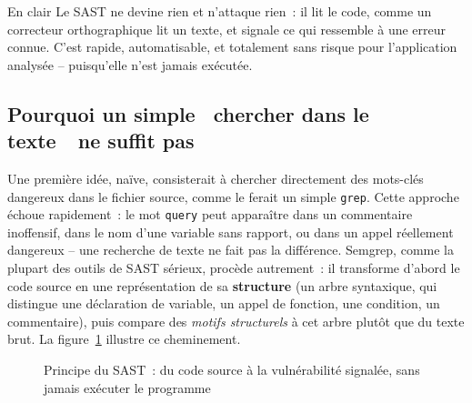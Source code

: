 \documentclass[12pt,a4paper,oneside]{report}
\begin{document}
\begin{infobox}{En clair}
Le SAST ne devine rien et n'attaque rien~: il lit le code, comme un correcteur orthographique lit un texte, et signale ce qui ressemble \`a une erreur connue. C'est rapide, automatisable, et totalement sans risque pour l'application analys\'ee -- puisqu'elle n'est jamais ex\'ecut\'ee.
\end{infobox}

\subsection{Pourquoi un simple \guillemotleft~chercher dans le texte~\guillemotright\ ne suffit pas}
Une premi\`ere id\'ee, na\"ive, consisterait \`a chercher directement des mots-cl\'es dangereux dans le fichier source, comme le ferait un simple \texttt{grep}. Cette approche \'echoue rapidement~: le mot \texttt{query} peut appara\^itre dans un commentaire inoffensif, dans le nom d'une variable sans rapport, ou dans un appel r\'eellement dangereux -- une recherche de texte ne fait pas la diff\'erence. Semgrep, comme la plupart des outils de SAST s\'erieux, proc\`ede autrement~: il transforme d'abord le code source en une repr\'esentation de sa \textbf{structure} (un arbre syntaxique, qui distingue une d\'eclaration de variable, un appel de fonction, une condition, un commentaire), puis compare des \emph{motifs structurels} \`a cet arbre plut\^ot que du texte brut. La figure~\ref{fig:sast-principe} illustre ce cheminement.

\begin{figure}[H]
\centering
{}
\caption{Principe du SAST~: du code source \`a la vuln\'erabilit\'e signal\'ee, sans jamais ex\'ecuter le programme}
\label{fig:sast-principe}
\end{figure}
\end{document}
